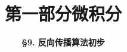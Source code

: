 




\title[Calculus]{\LARGE \bfseries 第一部分\quad 微积分} %
\author[\tiny Back Propagation] %
{\Large \bfseries \S 9. 反向传播算法初步
}
\date{}



\begin{frame}
\titlepage %
\end{frame}





